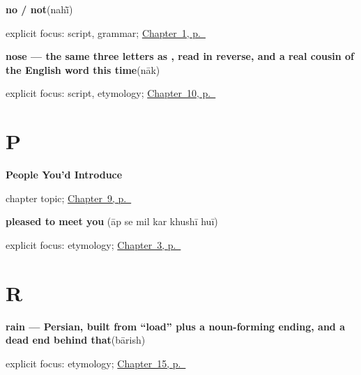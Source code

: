 \noindent\begin{minipage}[t]{\linewidth}
\raggedright
\textbf{no / not}\enspace\emph{}\enspace(nahī̃)\par
\footnotesize explicit focus: script, grammar; \hyperref[ch:urdu-greetings]{Chapter~1, p.~\pageref*{ch:urdu-greetings}}
\end{minipage}\par\smallskip

\noindent\begin{minipage}[t]{\linewidth}
\raggedright
\textbf{nose — the same three letters as , read in reverse, and a real cousin of the English word this time}\enspace\emph{}\enspace(nāk)\par
\footnotesize explicit focus: script, etymology; \hyperref[ch:ur-face-words]{Chapter~10, p.~\pageref*{ch:ur-face-words}}
\end{minipage}\par\smallskip

\section*{P}

\noindent\begin{minipage}[t]{\linewidth}
\raggedright
\textbf{People You'd Introduce}\par
\footnotesize chapter topic; \hyperref[ch:ur-people]{Chapter~9, p.~\pageref*{ch:ur-people}}
\end{minipage}\par\smallskip

\noindent\begin{minipage}[t]{\linewidth}
\raggedright
\textbf{pleased to meet you}\enspace\emph{     }\enspace(āp se mil kar khushī huī)\par
\footnotesize explicit focus: etymology; \hyperref[ch:ur-ask-and-answer-names]{Chapter~3, p.~\pageref*{ch:ur-ask-and-answer-names}}
\end{minipage}\par\smallskip

\section*{R}

\noindent\begin{minipage}[t]{\linewidth}
\raggedright
\textbf{rain — Persian, built from \textquotedblleft{}load\textquotedblright{} plus a noun-forming ending, and a dead end behind that}\enspace\emph{}\enspace(bārish)\par
\footnotesize explicit focus: etymology; \hyperref[ch:ur-weather]{Chapter~15, p.~\pageref*{ch:ur-weather}}
\end{minipage}\par\smallskip

